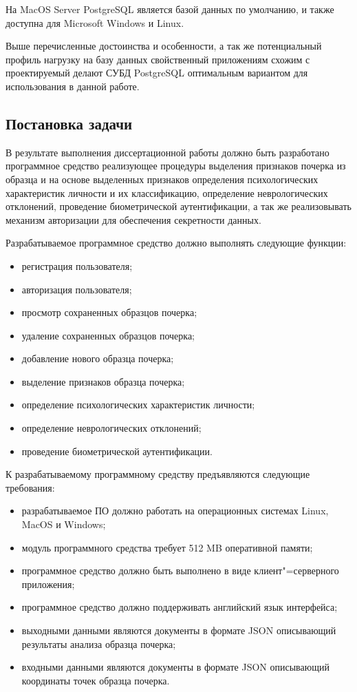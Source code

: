 На MacOS Server PostgreSQL является базой данных по умолчанию, и также доступна для Microsoft Windows и Linux.

Выше перечисленные достоинства и особенности, а так же потенциальный профиль нагрузку на базу данных свойственный приложениям схожим с проектируемый делают СУБД PostgreSQL оптимальным вариантом для использования в данной работе.  
\subsection{Постановка задачи}
\label{sec:domain:requirements}
В результате выполнения диссертационной работы должно быть разработано программное средство реализующее процедуры выделения признаков почерка из образца и на основе выделенных признаков определения психологических характеристик личности и их классификацию, определение неврологических отклонений, проведение биометрической аутентификации, а так же реализовывать механизм авторизации для обеспечения секретности данных.

Разрабатываемое программное средство должно выполнять следующие функции:
\begin{itemize}
  \item регистрация пользователя;
  \item авторизация пользователя;
  \item просмотр сохраненных образцов почерка;
  \item удаление сохраненных образцов почерка;
  \item добавление нового образца почерка;
  \item выделение признаков образца почерка;
  \item определение психологических характеристик личности;
  \item определение неврологических отклонений;
  \item проведение биометрической аутентификации.
\end{itemize}

К разрабатываемому программному средству предъявляются следующие требования:
\begin{itemize}
  \item разрабатываемое ПО должно работать на операционных системах Linux, MacOS и Windows;
  \item модуль программного средства требует 512 MB оперативной \mbox{памяти};
  \item программное средство должно быть выполнено в виде клиент"=серверного приложения;
  \item программное средство должно поддерживать английский язык \mbox{интерфейса;}
  \item выходными данными являются документы в формате JSON описывающий результаты анализа образца почерка;
  \item входными данными являются документы в формате JSON описывающий координаты точек образца почерка.
\end{itemize}